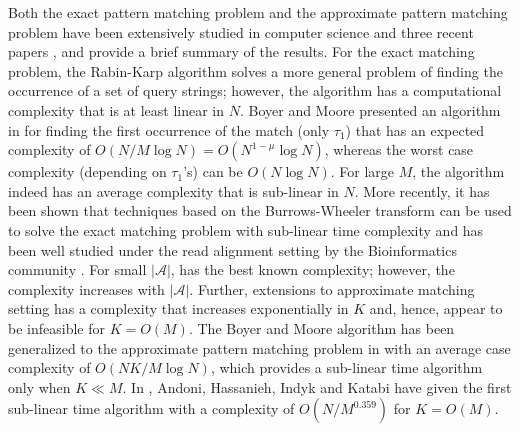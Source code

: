 Both the exact pattern matching problem and the approximate pattern matching problem have been extensively studied in computer science and three recent papers \cite{andoni2013shift}, \cite{amir2004faster} and \cite{navarro2001guided} provide a brief summary of the results. For the exact matching problem, the Rabin-Karp algorithm solves a more general problem of finding the occurrence of a set of query strings; however, the algorithm has a computational complexity that is at least linear in $N$. Boyer and Moore presented an algorithm in \cite{boyer1977fast} for finding the first occurrence of the match (only $\tau_1$) that has an expected complexity of $O(N/M \log N) = O(N^{1-\mu} \log N)$, whereas the worst case complexity (depending on $\tau_1$'s) can be $O(N \log N)$. For large $M$, the algorithm indeed has an average complexity that is sub-linear in $N$. More recently, it has been shown that techniques based on the Burrows-Wheeler transform can be used to solve the exact matching problem with sub-linear time complexity \cite{ferragina2005indexing} and has been well studied under the read alignment setting by the Bioinformatics community \cite{li2009fast,li2010fast}. For small $|\mathcal{A}|$, has the best known complexity; however, the complexity increases with $|\mathcal{A}|$. Further, extensions to approximate matching setting \cite{zhang2003approximate} has a complexity that increases exponentially in $K$ and, hence, appear to be infeasible for $K = O(M)$. The Boyer and Moore algorithm has been generalized to the approximate pattern matching problem in \cite{chang1994approximate} with an average case complexity of $O(NK/M \log N)$, which provides a sub-linear time algorithm only when $K \ll M$. In \cite{andoni2013shift}, Andoni, Hassanieh, Indyk and Katabi have given the first sub-linear time algorithm with a complexity of $O(N/M^{0.359})$ for $K = O(M)$.

